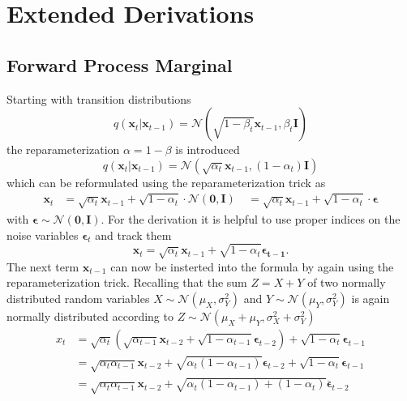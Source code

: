 %
\chapter{Extended Derivations}
\section{Forward Process Marginal}
\label{app:forward}
Starting with transition distributions
\begin{equation}
    q(\bm{x}_t|\bm{x}_{t-1}) = \mathcal{N}(\sqrt{1-\beta_t} \bm{x}_{t-1}, \beta_t \bm{I})
\end{equation}
the reparameterization $\alpha = 1 - \beta$ is introduced
\begin{equation}
    q(\bm{x}_t|\bm{x}_{t-1}) = \mathcal{N}(\sqrt{\alpha_t} \bm{x}_{t-1}, (1-\alpha_t) \bm{I})
\end{equation}
which can be reformulated using the reparameterization trick as
\begin{align}
    \bm{x}_t & = \sqrt{\alpha_t}\bm{x}_{t-1} + \sqrt{1-\alpha_t}\cdot\mathcal{N}(\bm{0}, \bm{I}) \
             & = \sqrt{\alpha_t}\bm{x}_{t-1} + \sqrt{1-\alpha_t} \cdot \bm{\epsilon}
\end{align}
with $\bm{\epsilon} \sim \mathcal{N}(\bm{0}, \bm{I})$. For the derivation it is helpful to use proper indices on the noise variables $\bm{\epsilon}_t$ and track them
\begin{equation}
    \bm{x}_{t} = \sqrt{\alpha_t}\bm{x}_{t-1} + \sqrt{1-\alpha_t}\bm{\epsilon_{t-1}}.
    \label{eq:forward_randomvar}
\end{equation}
The next term $\bm{x}_{t-1}$ can now be insterted into the formula by again using the reparameterization trick. Recalling that the sum $Z = X + Y$ of two normally distributed random variables $X \sim \mathcal{N}(\mu_X, \sigma_Y^2)$ and $Y \sim \mathcal{N}(\mu_Y, \sigma_Y^2)$ is again normally distributed according to $Z \sim \mathcal{N}(\mu_X + \mu_Y, \sigma_X^2 + \sigma_Y^2)$
\begin{align}
    x_t & = \sqrt{\alpha_t} \left( \sqrt{\alpha_{t-1}} \bm{x}_{t-2} + \sqrt{1-\alpha_{t-1}}\bm{\epsilon}_{t-2} \right) + \sqrt{1-\alpha_{t}} \bm{\epsilon}_{t-1} \\
        & = \sqrt{\alpha_{t}\alpha_{t-1}} \bm{x}_{t-2} + \sqrt{\alpha_{t}(1-\alpha_{t-1})} \bm{\epsilon}_{t-2} + \sqrt{1-\alpha_{t}} \bm{\epsilon}_{t-1}         \\
        & = \sqrt{\alpha_{t}\alpha_{t-1}} \bm{x}_{t-2} + \sqrt{\alpha_{t}(1-\alpha_{t-1}) + (1-\alpha_{t})} \bm{\bar{\epsilon}}_{t-2}
\end{align}
